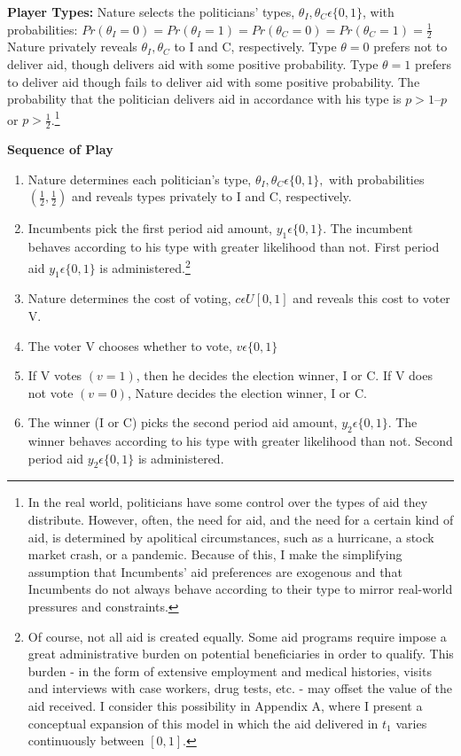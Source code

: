 \documentclass[12pt]{paper}
\begin{document}
\textbf{Player Types:} Nature selects the politicians’ types, $\theta_I, \theta_C \epsilon \{0,1\}$, with probabilities: $Pr(\theta_I=0)=Pr(\theta_I=1)=Pr(\theta_C=0)=Pr(\theta_C=1)= \frac{1}{2}$ Nature privately reveals $\theta_I,\theta_C$ to I and C, respectively. Type $\theta=0$ prefers not to deliver aid, though delivers aid with some positive probability. Type $\theta=1$ prefers to deliver aid though fails to deliver aid with some positive probability. The probability that the politician delivers aid in accordance with his type is $p > 1 – p$ or $p > \frac{1}{2}$.\footnote{In the real world, politicians have some control over the types of aid they distribute. However, often, the need for aid, and the need for a certain kind of aid, is determined by apolitical circumstances, such as a hurricane, a stock market crash, or a pandemic. Because of this, I make the simplifying assumption that Incumbents' aid preferences are exogenous and that Incumbents do not always behave according to their type to mirror real-world pressures and constraints.}

\textbf{Sequence of Play}
\begin{enumerate}
	\item Nature determines each politician’s type, $\theta_I, \theta_C \epsilon \{0,1\},$ with probabilities $(\frac{1}{2}, \frac{1}{2})$ and reveals types privately to I and C, respectively.
	\item Incumbents pick the first period aid amount, $y_1\epsilon \{0,1\}.$ The incumbent behaves according to his type with greater likelihood than not. First period aid $y_1\epsilon \{0,1\}$ is administered.\footnote{Of course, not all aid is created equally. Some aid programs require impose a great administrative burden on potential beneficiaries in order to qualify. This burden - in the form of extensive employment and medical histories, visits and interviews with case workers, drug tests, etc. - may offset the value of the aid received. I consider this possibility in Appendix A, where I present a conceptual expansion of this model in which the aid delivered in $t_1$ varies continuously between $[0,1]$.}
	\item Nature determines the cost of voting, $c \epsilon U[0,1]$ and reveals this cost to voter V.
	\item The voter V chooses whether to vote, $v \epsilon \{0,1\}$
	\item If V votes $(v=1)$, then he decides the election winner, I or C. If V does not vote $(v=0)$, Nature decides the election winner, I or C.
	\item The winner (I or C) picks the second period aid amount, $y_2 \epsilon \{0,1\}$. The winner behaves according to his type with greater likelihood than not. Second period aid  $y_2 \epsilon \{0,1\}$ is administered.
\end{enumerate}
\end{document}
